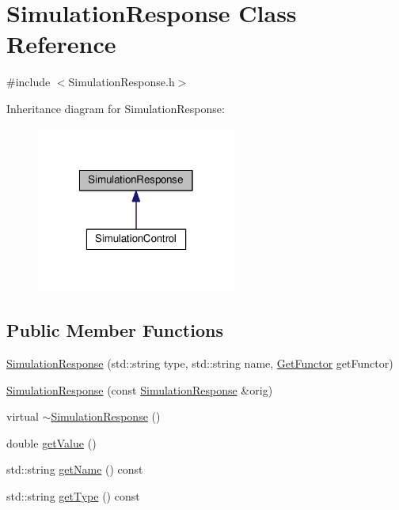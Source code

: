 \hypertarget{class_simulation_response}{\section{Simulation\-Response Class Reference}
\label{class_simulation_response}
}


{\ttfamily \#include $<$Simulation\-Response.\-h$>$}



Inheritance diagram for Simulation\-Response\-:\nopagebreak
\begin{figure}[H]
\begin{center}
\leavevmode
\includegraphics[width=186pt]{class_simulation_response__inherit__graph}
\end{center}
\end{figure}
\subsection*{Public Member Functions}
\begin{DoxyCompactItemize}
\item 
\hyperlink{class_simulation_response_a04cf14f90cd74a234491c653c772834e}{Simulation\-Response} (std\-::string type, std\-::string name, \hyperlink{_functor_8h_a69893c7d35bc5c3bdb40b1034fe4838e}{Get\-Functor} get\-Functor)
\item 
\hyperlink{class_simulation_response_aaa3a1bdb3a9a330eea2264fdeaa2bdb2}{Simulation\-Response} (const \hyperlink{class_simulation_response}{Simulation\-Response} \&orig)
\item 
virtual \hyperlink{class_simulation_response_acca988782297cd916b8a8532368fc94d}{$\sim$\-Simulation\-Response} ()
\item 
double \hyperlink{class_simulation_response_a192c1e10f0ecd3e6f6a06990bc73c07a}{get\-Value} ()
\item 
std\-::string \hyperlink{class_simulation_response_a2f1db747e9dfd4d641d761b6cf23af9b}{get\-Name} () const 
\item 
std\-::string \hyperlink{class_simulation_response_a3fd37c35a74ec17b651eea2e145ecf4f}{get\-Type} () const 
\end{DoxyCompactItemize}
